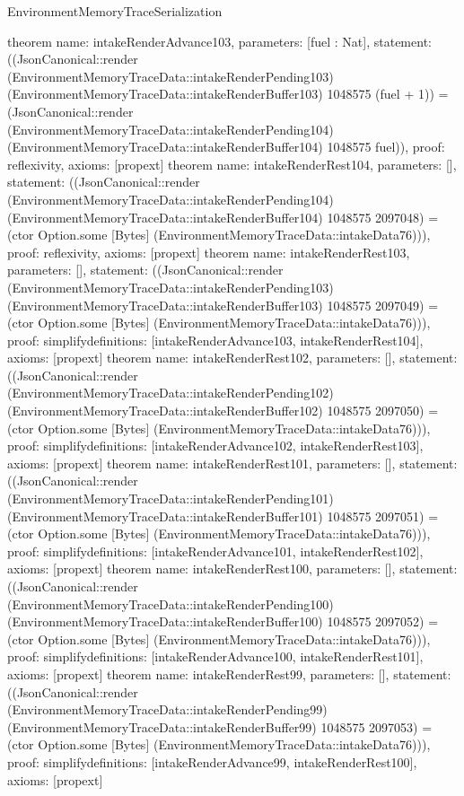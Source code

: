 \begin{lexlean}{EnvironmentMemoryTraceSerialization}
\begin{semanticmodule}
{}
theorem{
 name: intakeRenderAdvance103, parameters: [fuel : Nat],
 statement: ((JsonCanonical::render (EnvironmentMemoryTraceData::intakeRenderPending103) (EnvironmentMemoryTraceData::intakeRenderBuffer103) 1048575 (fuel + 1)) = (JsonCanonical::render (EnvironmentMemoryTraceData::intakeRenderPending104) (EnvironmentMemoryTraceData::intakeRenderBuffer104) 1048575 fuel)), proof: reflexivity{}, axioms: [propext]
}
theorem{
 name: intakeRenderRest104, parameters: [],
 statement: ((JsonCanonical::render (EnvironmentMemoryTraceData::intakeRenderPending104) (EnvironmentMemoryTraceData::intakeRenderBuffer104) 1048575 2097048) = (ctor Option.some [Bytes] (EnvironmentMemoryTraceData::intakeData76))), proof: reflexivity{}, axioms: [propext]
}
theorem{
 name: intakeRenderRest103, parameters: [],
 statement: ((JsonCanonical::render (EnvironmentMemoryTraceData::intakeRenderPending103) (EnvironmentMemoryTraceData::intakeRenderBuffer103) 1048575 2097049) = (ctor Option.some [Bytes] (EnvironmentMemoryTraceData::intakeData76))), proof: simplify{definitions: [intakeRenderAdvance103, intakeRenderRest104]}, axioms: [propext]
}
theorem{
 name: intakeRenderRest102, parameters: [],
 statement: ((JsonCanonical::render (EnvironmentMemoryTraceData::intakeRenderPending102) (EnvironmentMemoryTraceData::intakeRenderBuffer102) 1048575 2097050) = (ctor Option.some [Bytes] (EnvironmentMemoryTraceData::intakeData76))), proof: simplify{definitions: [intakeRenderAdvance102, intakeRenderRest103]}, axioms: [propext]
}
theorem{
 name: intakeRenderRest101, parameters: [],
 statement: ((JsonCanonical::render (EnvironmentMemoryTraceData::intakeRenderPending101) (EnvironmentMemoryTraceData::intakeRenderBuffer101) 1048575 2097051) = (ctor Option.some [Bytes] (EnvironmentMemoryTraceData::intakeData76))), proof: simplify{definitions: [intakeRenderAdvance101, intakeRenderRest102]}, axioms: [propext]
}
theorem{
 name: intakeRenderRest100, parameters: [],
 statement: ((JsonCanonical::render (EnvironmentMemoryTraceData::intakeRenderPending100) (EnvironmentMemoryTraceData::intakeRenderBuffer100) 1048575 2097052) = (ctor Option.some [Bytes] (EnvironmentMemoryTraceData::intakeData76))), proof: simplify{definitions: [intakeRenderAdvance100, intakeRenderRest101]}, axioms: [propext]
}
theorem{
 name: intakeRenderRest99, parameters: [],
 statement: ((JsonCanonical::render (EnvironmentMemoryTraceData::intakeRenderPending99) (EnvironmentMemoryTraceData::intakeRenderBuffer99) 1048575 2097053) = (ctor Option.some [Bytes] (EnvironmentMemoryTraceData::intakeData76))), proof: simplify{definitions: [intakeRenderAdvance99, intakeRenderRest100]}, axioms: [propext]
}
\end{semanticmodule}
\end{lexlean}
